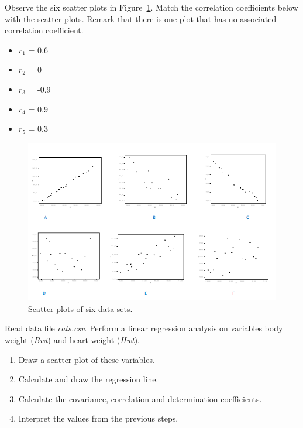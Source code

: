 \begin{exercise}
  Observe the six scatter plots in Figure~\ref{fig:correlations}. Match the correlation coefficients below with the scatter plots. Remark that there is one plot that has no associated correlation coefficient.
  
  \begin{itemize}
    \item $r_{1}$ = 0.6
    \item $r_{2}$ = 0
    \item $r_{3}$ = -0.9
    \item $r_{4}$ = 0.9
    \item $r_{5}$ = 0.3
  \end{itemize}
\end{exercise}

\begin{figure}
  \centering
  \includegraphics[width=\textwidth]{images/correlaties.png}
  \caption{Scatter plots of six data sets.}
\label{fig:correlations}
\end{figure}

\begin{exercise}
  \label{ex:cats}
  Read data file \emph{cats.csv}. Perform a linear regression analysis on variables body weight (\emph{Bwt}) and heart weight (\emph{Hwt}).
  
  \begin{enumerate}
  \item Draw a scatter plot of these variables.
  \item Calculate and draw the regression line.
  \item Calculate the covariance, correlation and determination coefficients.
  \item Interpret the values from the previous steps.
  \end{enumerate}
\end{exercise}

